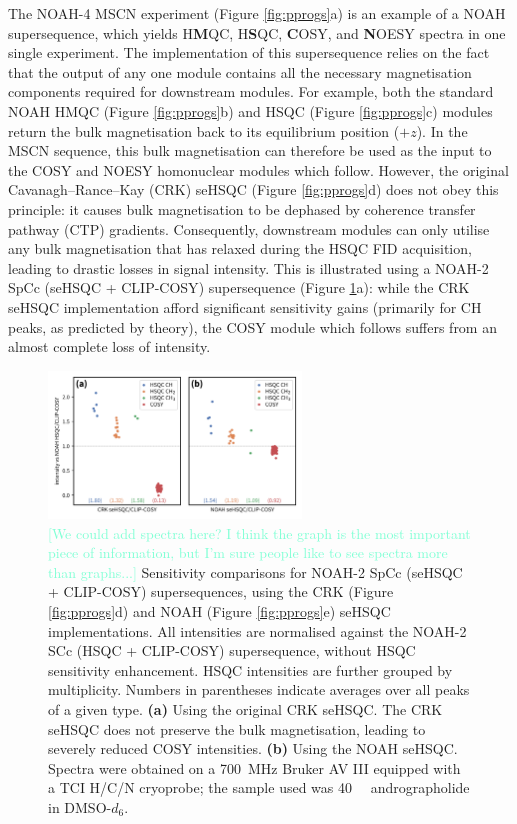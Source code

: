 \documentclass[11pt]{article}
\newcommand*{\carbon}{\ce{^{13}C}}
\newcommand*{\nitrogen}{\ce{^{15}N}}
\newcommand*{\hl}[1]{\textcolor{Aquamarine}{[#1]}}
\newcommand*{\figref}[1]{Figure \ref{fig:#1}}
\newcommand*{\andro}{Spectra were obtained on a \SI{700}{\MHz} Bruker AV III equipped with a TCI H/C/N cryoprobe; the sample used was \SI{40}{\milli\molar} andrographolide in DMSO-$d_6$.}
\begin{document}
The NOAH-4 MSCN experiment (\figref{pprogs}a) is an example of a NOAH supersequence, which yields \nitrogen{} H\textbf{M}QC, \carbon{} H\textbf{S}QC, \textbf{C}OSY, and \textbf{N}OESY spectra in one single experiment.
The implementation of this supersequence relies on the fact that the output of any one module contains all the necessary magnetisation components required for downstream modules.
For example, both the standard NOAH HMQC (\figref{pprogs}b) and HSQC (\figref{pprogs}c) modules return the bulk magnetisation back to its equilibrium position ($+z$).
In the MSCN sequence, this bulk magnetisation can therefore be used as the input to the COSY and NOESY homonuclear modules which follow.
However, the original Cavanagh--Rance--Kay (CRK) seHSQC (\figref{pprogs}d) does not obey this principle: it causes bulk magnetisation to be dephased by coherence transfer pathway (CTP) gradients.
Consequently, downstream modules can only utilise any bulk magnetisation that has relaxed during the HSQC FID acquisition, leading to drastic losses in signal intensity.
This is illustrated using a NOAH-2 SpCc (seHSQC + CLIP-COSY\autocite{Koos2016ACIE}) supersequence (\figref{spor_spv2}a): while the CRK seHSQC implementation afford significant sensitivity gains (primarily for CH peaks, as predicted by theory\autocite{sehsqc_sens}), the COSY module which follows suffers from an almost complete loss of intensity.

\begin{figure}
    \centering
    \includegraphics[width=0.6\textwidth]{spor_spv2_comp.png}
    \caption{
        \hl{We could add spectra here? I think the graph is the most important piece of information, but I'm sure people like to see spectra more than graphs...}
        Sensitivity comparisons for NOAH-2 SpCc (seHSQC + CLIP-COSY) supersequences, using the CRK (\figref{pprogs}d) and NOAH (\figref{pprogs}e) seHSQC implementations.
        All intensities are normalised against the NOAH-2 SCc (HSQC + CLIP-COSY) supersequence, without HSQC sensitivity enhancement.
        HSQC intensities are further grouped by multiplicity.
        Numbers in parentheses indicate averages over all peaks of a given type.
        \textbf{(a)} Using the original CRK seHSQC.
        The CRK seHSQC does not preserve the bulk magnetisation, leading to severely reduced COSY intensities.
        \textbf{(b)} Using the NOAH seHSQC.
        \andro{}
    }
    \label{fig:spor_spv2}
\end{figure}
\end{document}
